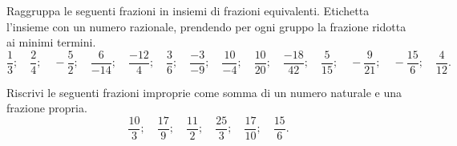  \subsubsection*{}


\begin{esercizio}
\label{ese:3.17}
Raggruppa le seguenti frazioni in insiemi di frazioni equivalenti.
Etichetta l'insieme con un numero razionale, prendendo per ogni gruppo la 
frazione ridotta ai minimi termini.
{\footnotesize
\[\frac{1}{3};\quad \frac{2}{4};\quad -\frac{5}{2};\quad 
  \frac{6}{-14};\quad \frac{-12}{4};\quad \frac{3}{6};\quad 
  \frac{-3}{-9};\quad \frac{10}{-4};\quad \frac{10}{20};\quad 
  \frac{-18}{42};\quad \frac{5}{15};\quad -\frac{9}{21};\quad 
-\frac{15}{6};\quad \frac{4}{12}.\]}
\end{esercizio}

\begin{esercizio}
\label{ese:3.18}
 Riscrivi le seguenti frazioni improprie come somma di un numero naturale e 
 una frazione propria.
\[\frac{10}{3};\quad \frac{17}{9};\quad \frac{11}{2};\quad 
  \frac{25}{3};\quad \frac{17}{10};\quad \frac{15}{6}.\]
\end{esercizio}


